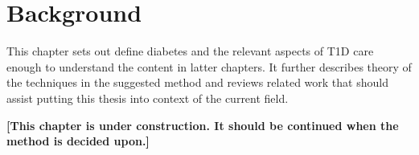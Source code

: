 \chapter{Background}

This chapter sets out define diabetes and the relevant aspects of T1D care enough to understand the content in latter chapters.
It further describes theory of the techniques in the suggested method and reviews related work that should assist putting this thesis into context of the current field.

\textbf{[This chapter is under construction. It should be continued when the method is decided upon.]}

%
%
%
%
%
%
%
